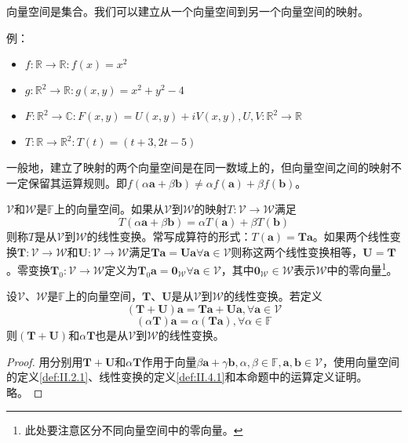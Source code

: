 \documentclass[main.tex]{subfiles}
\begin{document}
向量空间是集合。我们可以建立从一个向量空间到另一个向量空间的映射。

例：
\begin{itemize}
    \item $f:\mathbb{R}\rightarrow\mathbb{R}:f\left(x\right)=x^2$
    \item $g:\mathbb{R}^2\rightarrow\mathbb{R}:g\left(x,y\right)=x^2+y^2-4$
    \item $F:\mathbb{R}^2\rightarrow\mathbb{C}:F\left(x,y\right)=U\left(x,y\right)+iV\left(x,y\right),U,V:\mathbb{R}^2\rightarrow\mathbb{R}$
    \item $T:\mathbb{R}\rightarrow\mathbb{R}^2:T\left(t\right)=\left(t+3,2t-5\right)$
\end{itemize}

一般地，建立了映射的两个向量空间是在同一数域上的，但向量空间之间的映射不一定保留其运算规则。即$f\left(\alpha\mathbf{a}+\beta\mathbf{b}\right)\neq\alpha f\left(\mathbf{a}\right)+\beta f\left(\mathbf{b}\right)$。

\begin{definition}[线性变换]\label{def:II.4.1}
$\mathcal{V}$和$\mathcal{W}$是$\mathbb{F}$上的向量空间。如果从$\mathcal{V}$到$\mathcal{W}$的映射$T:\mathcal{V}\rightarrow\mathcal{W}$满足
\[T\left(\alpha\mathbf{a}+\beta\mathbf{b}\right)=\alpha T\left(\mathbf{a}\right)+\beta T\left(\mathbf{b}\right)\]
则称$T$是从$\mathcal{V}$到$\mathcal{W}$的线性变换。常写成算符的形式：$T\left(\mathbf{a}\right)=\mathbf{Ta}$。如果两个线性变换$\mathbf{T}:\mathcal{V}\rightarrow\mathcal{W}$和$\mathbf{U}:\mathcal{V}\rightarrow\mathcal{W}$满足$\mathbf{Ta}=\mathbf{Ua}\forall\mathbf{a}\in\mathcal{V}$则称这两个线性变换相等，$\mathbf{U}=\mathbf{T}$。零变换$\mathbf{T}_0:\mathcal{V}\rightarrow\mathcal{W}$定义为$\mathbf{T}_0\mathbf{a}=\mathbf{0}_\mathcal{W}\forall\mathbf{a}\in\mathcal{V}$，其中$\mathbf{0}_\mathcal{W}\in\mathcal{W}$表示$\mathcal{W}$中的零向量\footnote{此处要注意区分不同向量空间中的零向量。}。
\end{definition}

\begin{theorem}\label{thm:II.4.1}
设$\mathcal{V}$、$\mathcal{W}$是$\mathbb{F}$上的向量空间，$\mathbf{T}$、$\mathbf{U}$是从$\mathcal{V}$到$\mathcal{W}$的线性变换。若定义
\[\left(\mathbf{T}+\mathbf{U}\right)\mathbf{a}=\mathbf{Ta}+\mathbf{Ua},\forall\mathbf{a}\in\mathcal{V}\]
\[\left(\alpha\mathbf{T}\right)\mathbf{a}=\alpha\left(\mathbf{Ta}\right),\forall\alpha\in\mathbb{F}\]
则$\left(\mathbf{T}+\mathbf{U}\right)$和$\alpha\mathbf{T}$也是从$\mathcal{V}$到$\mathcal{W}$的线性变换。
\end{theorem}
\begin{proof}
用分别用$\mathbf{T}+\mathbf{U}$和$\alpha\mathbf{T}$作用于向量$\beta\mathbf{a}+\gamma\mathbf{b},\alpha,\beta\in\mathbb{F},\mathbf{a},\mathbf{b}\in\mathcal{V}$，使用向量空间的定义\ref{def:II.2.1}、线性变换的定义\ref{def:II.4.1}和本命题中的运算定义证明。略。
\end{proof}
\end{document}
